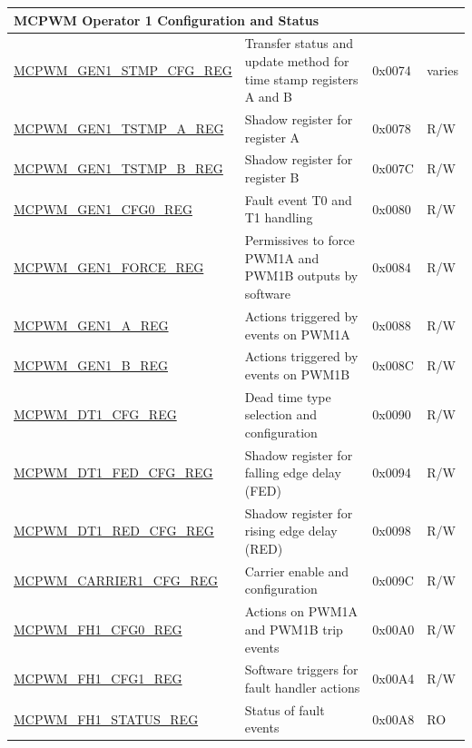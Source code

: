 \begin{longtable}{ | p{6cm} | p{7.2cm} | p{1.3cm} | p{1cm} | }
\multicolumn{4}{|l|}{\textbf{MCPWM Operator 1 Configuration and Status}} \\ \hline
\hyperref[regdesc:MCPWMGENNSTMPCFGREG]{MCPWM\_GEN1\_STMP\_CFG\_REG} & Transfer status and update method for time stamp registers A and B & 0x0074 & varies \\ \hline
\hyperref[regdesc:MCPWMGENNTSTMPAREG]{MCPWM\_GEN1\_TSTMP\_A\_REG} & Shadow register for register A & 0x0078 & R/W \\ \hline
\hyperref[regdesc:MCPWMGENNTSTMPBREG]{MCPWM\_GEN1\_TSTMP\_B\_REG} & Shadow register for register B & 0x007C & R/W \\ \hline
\hyperref[regdesc:MCPWMGENNCFG0REG]{MCPWM\_GEN1\_CFG0\_REG} & Fault event T0 and T1 handling & 0x0080 & R/W \\ \hline
\hyperref[regdesc:MCPWMGENNFORCEREG]{MCPWM\_GEN1\_FORCE\_REG} & Permissives to force PWM1A and PWM1B outputs by software & 0x0084 & R/W \\ \hline
\hyperref[regdesc:MCPWMGENNAREG]{MCPWM\_GEN1\_A\_REG} & Actions triggered by events on PWM1A & 0x0088 & R/W \\ \hline
\hyperref[regdesc:MCPWMGENNBREG]{MCPWM\_GEN1\_B\_REG} & Actions triggered by events on PWM1B & 0x008C & R/W \\ \hline
\hyperref[regdesc:MCPWMDTNCFGREG]{MCPWM\_DT1\_CFG\_REG} & Dead time type selection and configuration & 0x0090 & R/W \\ \hline
\hyperref[regdesc:MCPWMDTNFEDCFGREG]{MCPWM\_DT1\_FED\_CFG\_REG} & Shadow register for falling edge delay (FED) & 0x0094 & R/W \\ \hline
\hyperref[regdesc:MCPWMDTNREDCFGREG]{MCPWM\_DT1\_RED\_CFG\_REG} & Shadow register for rising edge delay (RED) & 0x0098 & R/W \\ \hline
\hyperref[regdesc:MCPWMCARRIERNCFGREG]{MCPWM\_CARRIER1\_CFG\_REG} & Carrier enable and configuration & 0x009C & R/W \\ \hline
\hyperref[regdesc:MCPWMFHNCFG0REG]{MCPWM\_FH1\_CFG0\_REG} & Actions on PWM1A and PWM1B trip events & 0x00A0 & R/W \\ \hline
\hyperref[regdesc:MCPWMFHNCFG1REG]{MCPWM\_FH1\_CFG1\_REG} & Software triggers for fault handler actions & 0x00A4 & R/W \\ \hline
\hyperref[regdesc:MCPWMFHNSTATUSREG]{MCPWM\_FH1\_STATUS\_REG} & Status of fault events & 0x00A8 & RO \\ \hline


\end{longtable}
